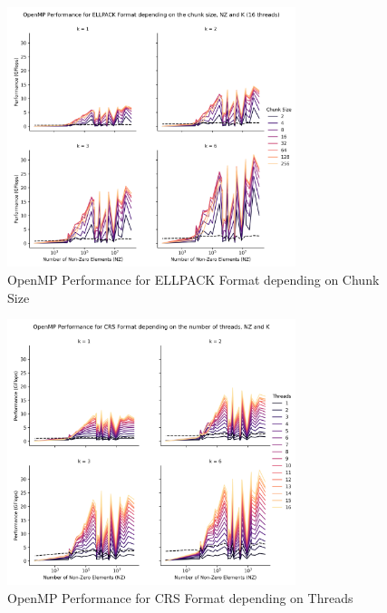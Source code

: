 \documentclass[12pt,oneside]{book} %
\begin{document}
\begin{figure}[H]
    \centering
    \includegraphics[width=0.75\textwidth]{../results/images/openMP_ChunkSize_ELLPACK.png}
    \caption{OpenMP Performance for ELLPACK Format depending on Chunk Size}
    \label{fig:openmpchunksizellpack}
\end{figure}

\begin{figure}[H]
    \centering
    \includegraphics[width=0.75\textwidth]{../results/images/openMP_Threads_CRS.png}
    \caption{OpenMP Performance for CRS Format depending on Threads}
    \label{fig:openmpthreadscrs}
\end{figure}
\end{document}
